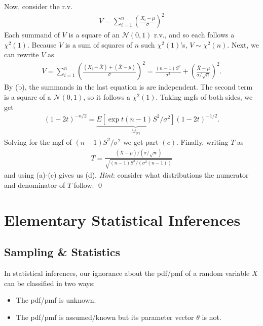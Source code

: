 \documentclass{book}
\theoremstyle{definition}
\newcommand{\N}{\mathcal{N}}
\newcommand{\f}[2]{\frac{#1}{#2}}
\newcommand{\lp}{\left(}
\newcommand{\rp}{\right)}
\begin{document}
Now, consider the r.v. 
\begin{align}
V = \sum^n_{i=1} \lp\f{X_i - \mu}{\sigma}\rp^2
\end{align} 
Each summand of $V$ is a square of an $\N(0,1)$ r.v., and so each follows a $\chi^2(1)$. Because $V$ is a sum of squares of $n$ such $\chi^2(1)$'s, $V \sim\chi^2(n)$. Next, we can rewrite $V$ as
\begin{align}
V = \sum^n_{i=1}\lp \f{(X_i - \bar{X}) + (\bar{X} - \mu)}{\sigma} \rp^2 = \f{(n-1)S^2}{\sigma^2} + \lp \f{\bar{X} - \mu}{\sigma/\sqrt{n}} \rp^2.
\end{align}
By (b), the summands in the last equation is are independent. The second term is a square of a $\N(0,1)$, so it follows a $\chi^2(1)$. Taking mgfs of both sides, we get
\begin{align}
(1-2t)^{-n/2} = \underbrace{E[\exp{t(n-1)S^2/\sigma^2}]}_{M_{\text{(c)}}} (1-2t)^{-1/2}.
\end{align}
Solving for the mgf of $(n-1)S^2/\sigma^2$ we get part $(c)$. Finally, writing $T$ as
\begin{align}
T = \f{(\bar{X} - \mu)/(\sigma/\sqrt{n})}{\sqrt{(n-1)S^2/(\sigma^2(n-1))}}
\end{align}
and using (a)-(c) gives us (d). \textit{Hint}: consider what distributions the numerator and denominator of $T$ follow. \qed
















\chapter{Elementary Statistical Inferences}
\newpage

\section{Sampling \& Statistics}

In statistical inferences, our ignorance about the pdf/pmf of a random variable $X$ can be classified in two ways:
\begin{itemize}
	\item The pdf/pmf is unknown.
	\item The pdf/pmf is assumed/known but its parameter vector $\theta$ is not.
\end{itemize}
\end{document}
